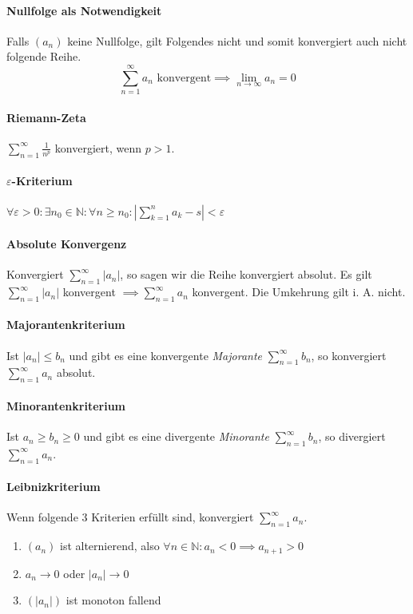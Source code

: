 \documentclass[a4paper, 9pt, DIV=24]{scrartcl}
\newcommand{\N}{\mathbb{N}}
\begin{document}
\paragraph{Nullfolge als Notwendigkeit}
Falls $(a_n)$ keine Nullfolge, gilt Folgendes nicht und somit konvergiert auch nicht folgende Reihe.
\[ \sum_{n=1}^\infty a_n \text{ konvergent} \implies \lim_{n \to \infty} a_n = 0 \]

\paragraph{Riemann-Zeta}
$\sum_{n=1}^{\infty}{\frac{1}{n^p}}$ konvergiert, wenn $p>1$.

\paragraph{$\varepsilon$-Kriterium}
$\forall \varepsilon > 0: \exists n_0 \in \N: \forall n \geq n_0: | \sum_{k=1}^n a_k - s | < \varepsilon$

\paragraph{Absolute Konvergenz}
Konvergiert $\sum_{n=1}^\infty |a_n|$, so sagen wir die Reihe konvergiert absolut.
Es gilt $\sum_{n=1}^\infty |a_n|$ konvergent $ \implies \sum_{n=1}^\infty a_n$ konvergent.
Die Umkehrung gilt i. A. nicht.

\paragraph{Majorantenkriterium}
Ist $|a_n| \leq b_n$ und gibt es eine konvergente \emph{Majorante} $\sum_{n=1}^\infty b_n$, so konvergiert $\sum_{n=1}^\infty a_n$ absolut.

\paragraph{Minorantenkriterium}
Ist $a_n \geq b_n \geq 0$ und gibt es eine divergente \emph{Minorante} $\sum_{n=1}^\infty b_n$, so divergiert $\sum_{n=1}^\infty a_n$.

\paragraph{Leibnizkriterium}
Wenn folgende 3 Kriterien erfüllt sind, konvergiert $\sum_{n=1}^\infty a_n$.
\begin{enumerate}[label={(}\arabic*{)}]
  \item $(a_n)$ ist alternierend, also $\forall n\in\N: a_n < 0 \implies a_{n+1} > 0$
  \item $a_n \to 0$ oder $|a_n| \to 0$
  \item $(|a_n|)$ ist monoton fallend
\end{enumerate}
\end{document}
